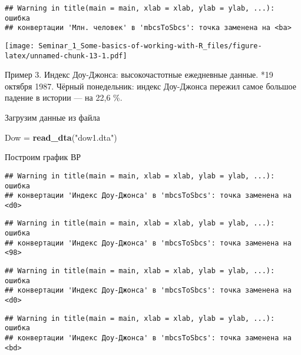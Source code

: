 \documentclass[
]{article}
\newenvironment{Shaded}{\begin{snugshade}}{\end{snugshade}}
\newcommand{\AttributeTok}[1]{\textcolor[rgb]{0.13,0.29,0.53}{#1}}
\newcommand{\FunctionTok}[1]{\textcolor[rgb]{0.13,0.29,0.53}{\textbf{#1}}}
\newcommand{\NormalTok}[1]{#1}
\newcommand{\OtherTok}[1]{\textcolor[rgb]{0.56,0.35,0.01}{#1}}
\newcommand{\SpecialCharTok}[1]{\textcolor[rgb]{0.81,0.36,0.00}{\textbf{#1}}}
\newcommand{\StringTok}[1]{\textcolor[rgb]{0.31,0.60,0.02}{#1}}
\begin{document}
\begin{verbatim}
## Warning in title(main = main, xlab = xlab, ylab = ylab, ...): ошибка
## конвертации 'Млн. человек' в 'mbcsToSbcs': точка заменена на <ba>
\end{verbatim}

\texttt{[image: Seminar\_1\_Some-basics-of-working-with-R\_files/figure-latex/unnamed-chunk-13-1.pdf]}

Пример 3. Индекс Доу-Джонса: высокочастотные ежедневные данные. *19
октября 1987. Чёрный понедельник: индекс Доу-Джонса пережил самое
большое падение в истории --- на 22,6 \%.

Загрузим данные из файла

\begin{Shaded}
\begin{Highlighting}[]
\NormalTok{Dow }\OtherTok{=} \FunctionTok{read\_dta}\NormalTok{(}\StringTok{"dow1.dta"}\NormalTok{)}
\end{Highlighting}
\end{Shaded}

Построим график ВР

\begin{Shaded}
\end{Shaded}

\begin{verbatim}
## Warning in title(main = main, xlab = xlab, ylab = ylab, ...): ошибка
## конвертации 'Индекс Доу-Джонса' в 'mbcsToSbcs': точка заменена на <d0>
\end{verbatim}

\begin{verbatim}
## Warning in title(main = main, xlab = xlab, ylab = ylab, ...): ошибка
## конвертации 'Индекс Доу-Джонса' в 'mbcsToSbcs': точка заменена на <98>
\end{verbatim}

\begin{verbatim}
## Warning in title(main = main, xlab = xlab, ylab = ylab, ...): ошибка
## конвертации 'Индекс Доу-Джонса' в 'mbcsToSbcs': точка заменена на <d0>
\end{verbatim}

\begin{verbatim}
## Warning in title(main = main, xlab = xlab, ylab = ylab, ...): ошибка
## конвертации 'Индекс Доу-Джонса' в 'mbcsToSbcs': точка заменена на <bd>
\end{verbatim}
\end{document}
